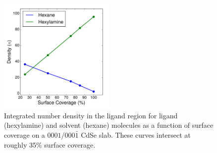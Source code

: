 \begin{figure}
\begin{center}
\includegraphics[width=0.5\textwidth]{./Chapter4/rnemd6.pdf}
\caption[Number density of hexane and hexylamine molecules in the hexylamine layer as a function of surface coverage.]{Integrated number density in the ligand region for ligand (hexylamine) and solvent (hexane) molecules as a function of surface coverage on a $0001$/$000\bar{1}$ CdSe slab. These curves intersect at roughly 35\% surface coverage.}
\label{f:rnemd6}
\end{center}
\end{figure}

